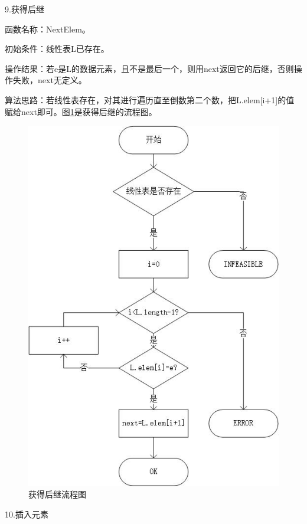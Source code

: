 \documentclass[supercite]{Experimental_Report}
\theoremstyle{definition}
\begin{document}
9.获得后继

函数名称：NextElem。

初始条件：线性表L已存在。

操作结果：若e是L的数据元素，且不是最后一个，则用next返回它的后继，否则操作失败，next无定义。

算法思路：若线性表存在，对其进行遍历直至倒数第二个数，把L.elem[i+1]的值赋给next即可。图\ref{fig1-9}是获得后继的流程图。
\begin{figure}[htb] %
	\begin{center}
		\includegraphics[scale=0.9]{./images/顺序表/next.jpg}
		\caption{获得后继流程图}
		\label{fig1-9}
	\end{center}
\end{figure}

\newpage

10.插入元素
\end{document}

